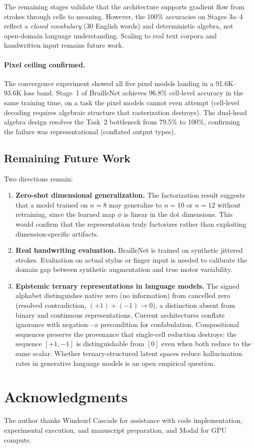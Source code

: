 \documentclass[11pt,a4paper]{article}
\begin{document}
The remaining stages validate that the architecture supports
gradient flow from strokes through cells to meaning.
However, the 100\% accuracies on Stages 3a--4 reflect a
\emph{closed vocabulary} (30 English words) and deterministic
algebra, not open-domain language understanding.
Scaling to real text corpora and handwritten input remains future work.

\paragraph{Pixel ceiling confirmed.}
The convergence experiment showed all five pixel models landing in
a 91.6K--93.6K loss band.
Stage~1 of BrailleNet achieves 96.8\% cell-level accuracy
in the same training time, on a task the pixel models cannot
even attempt (cell-level decoding requires algebraic structure
that rasterization destroys).
The dual-head algebra design resolves the
Task~2 bottleneck from 79.5\% to 100\%, confirming the
failure was representational (conflated output types).

\subsection{Remaining Future Work}

Two directions remain:

\begin{enumerate}
  \item \textbf{Zero-shot dimensional generalization.}
    The factorization result suggests that a model trained on
    $n=8$ may generalize to $n=10$ or $n=12$ without retraining,
    since the learned map $\phi$ is linear in the dot dimensions.
    This would confirm that the representation truly factorizes
    rather than exploiting dimension-specific artifacts.

  \item \textbf{Real handwriting evaluation.}
    BrailleNet is trained on synthetic jittered strokes.
    Evaluation on actual stylus or finger input is needed
    to calibrate the domain gap between synthetic augmentation
    and true motor variability.

  \item \textbf{Epistemic ternary representations in language models.}
    The signed alphabet distinguishes native zero (no information)
    from cancelled zero (resolved contradiction,
    $(+1) + (-1) \to 0$), a distinction absent from
    binary and continuous representations.
    Current architectures conflate ignorance with negation---a
    precondition for confabulation.
    Compositional sequences preserve the provenance that
    single-cell reduction destroys:
    the sequence $[+1, -1]$ is distinguishable from $[0]$
    even when both reduce to the same scalar.
    Whether ternary-structured latent spaces reduce
    hallucination rates in generative language models
    is an open empirical question.
\end{enumerate}

\section*{Acknowledgments}

The author thanks Windsurf Cascade for assistance with code
implementation, experimental execution, and manuscript preparation,
and Modal for GPU compute.



\end{document}
